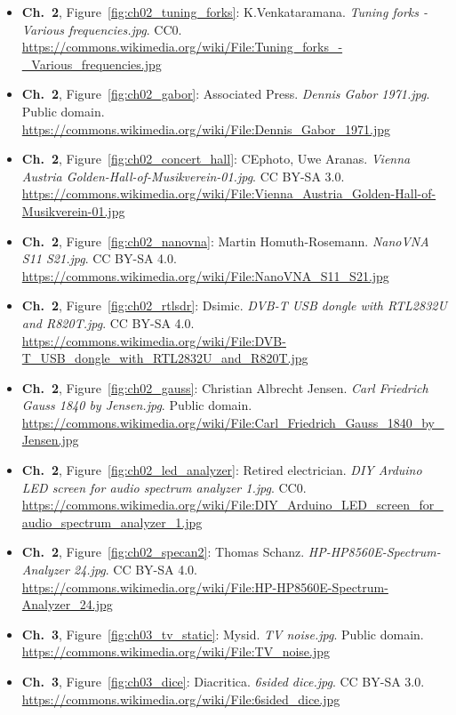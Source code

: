 \begin{small}
\begin{itemize}[leftmargin=0pt,itemsep=2pt,label={}]
\item \textbf{Ch.~2}, Figure~\ref{fig:ch02_tuning_forks}: K.Venkataramana. \emph{Tuning forks -\allowbreak{} Various frequencies.\allowbreak{}jpg}. CC0. \url{https://commons.wikimedia.org/wiki/File:Tuning_forks_-_Various_frequencies.jpg}
\item \textbf{Ch.~2}, Figure~\ref{fig:ch02_gabor}: Associated Press. \emph{Dennis Gabor 1971.\allowbreak{}jpg}. Public domain. \url{https://commons.wikimedia.org/wiki/File:Dennis_Gabor_1971.jpg}
\item \textbf{Ch.~2}, Figure~\ref{fig:ch02_concert_hall}: CEphoto, Uwe Aranas. \emph{Vienna Austria Golden-\allowbreak{}Hall-\allowbreak{}of-\allowbreak{}Musikverein-\allowbreak{}01.\allowbreak{}jpg}. CC BY-SA 3.0. \url{https://commons.wikimedia.org/wiki/File:Vienna_Austria_Golden-Hall-of-Musikverein-01.jpg}
\item \textbf{Ch.~2}, Figure~\ref{fig:ch02_nanovna}: Martin Homuth-Rosemann. \emph{NanoVNA S11 S21.\allowbreak{}jpg}. CC BY-SA 4.0. \url{https://commons.wikimedia.org/wiki/File:NanoVNA_S11_S21.jpg}
\item \textbf{Ch.~2}, Figure~\ref{fig:ch02_rtlsdr}: Dsimic. \emph{DVB-\allowbreak{}T USB dongle with RTL2832U and R820T.\allowbreak{}jpg}. CC BY-SA 4.0. \url{https://commons.wikimedia.org/wiki/File:DVB-T_USB_dongle_with_RTL2832U_and_R820T.jpg}
\item \textbf{Ch.~2}, Figure~\ref{fig:ch02_gauss}: Christian Albrecht Jensen. \emph{Carl Friedrich Gauss 1840 by Jensen.\allowbreak{}jpg}. Public domain. \url{https://commons.wikimedia.org/wiki/File:Carl_Friedrich_Gauss_1840_by_Jensen.jpg}
\item \textbf{Ch.~2}, Figure~\ref{fig:ch02_led_analyzer}: Retired electrician. \emph{DIY Arduino LED screen for audio spectrum analyzer 1.\allowbreak{}jpg}. CC0. \url{https://commons.wikimedia.org/wiki/File:DIY_Arduino_LED_screen_for_audio_spectrum_analyzer_1.jpg}
\item \textbf{Ch.~2}, Figure~\ref{fig:ch02_specan2}: Thomas Schanz. \emph{HP-\allowbreak{}HP8560E-\allowbreak{}Spectrum-\allowbreak{}Analyzer 24.\allowbreak{}jpg}. CC BY-SA 4.0. \url{https://commons.wikimedia.org/wiki/File:HP-HP8560E-Spectrum-Analyzer_24.jpg}
\item \textbf{Ch.~3}, Figure~\ref{fig:ch03_tv_static}: Mysid. \emph{TV noise.\allowbreak{}jpg}. Public domain. \url{https://commons.wikimedia.org/wiki/File:TV_noise.jpg}
\item \textbf{Ch.~3}, Figure~\ref{fig:ch03_dice}: Diacritica. \emph{6sided dice.\allowbreak{}jpg}. CC BY-SA 3.0. \url{https://commons.wikimedia.org/wiki/File:6sided_dice.jpg}

\end{itemize}
\end{small}
